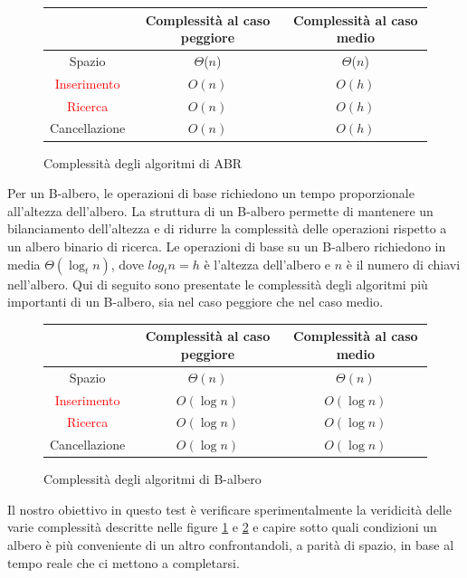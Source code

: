 \begin{figure}[H]
    \centering
    \begin{tabular}{|c|c|c|}
        \hline
         & Complessità al caso peggiore & Complessità al caso medio\\
        \hline
        Spazio & $\Theta$($n$) & $\Theta$($n$)\\
        \hline
        \textcolor{red}{Inserimento} & $O(n)$ & $O(h)$\\
        \hline
        \textcolor{red}{Ricerca} & $O(n)$ & $O(h)$\\
        \hline
        Cancellazione & $O(n)$ & $O(h)$\\
        \hline
    \end{tabular}
    \caption{Complessità degli algoritmi di ABR}
    \label{fig:ComplessitàABR}
\end{figure}

Per un B-albero, le operazioni di base richiedono un tempo proporzionale all'altezza dell'albero. La struttura di un B-albero permette di mantenere un bilanciamento dell'altezza e di ridurre la complessità delle operazioni rispetto a un albero binario di ricerca. Le operazioni di base su un B-albero richiedono in media \(\Theta(\log_t n)\), dove \(log_tn=h\) è l'altezza dell'albero e \(n\) è il numero di chiavi nell'albero. Qui di seguito sono presentate le complessità degli algoritmi più importanti di un B-albero, sia nel caso peggiore che nel caso medio.

\begin{figure}[H]
    \centering
    \begin{tabular}{|c|c|c|}
        \hline
         & Complessità al caso peggiore & Complessità al caso medio\\
        \hline
        Spazio & \(\Theta(n)\) & \(\Theta(n)\)\\
        \hline
        \textcolor{red}{Inserimento} & \(O(\log n)\) & \(O(\log n)\)\\
        \hline
        \textcolor{red}{Ricerca} & \(O(\log n)\) & \(O(\log n)\)\\
        \hline
        Cancellazione & \(O(\log n)\) & \(O(\log n)\)\\
        \hline
    \end{tabular}
    \caption{Complessità degli algoritmi di B-albero}
    \label{fig:ComplessitàBA}
\end{figure}


Il nostro obiettivo in questo test è verificare sperimentalmente la veridicità delle varie complessità descritte nelle figure \ref{fig:ComplessitàABR} e \ref{fig:ComplessitàBA} e capire sotto quali condizioni un albero è più conveniente di un altro confrontandoli, a parità di spazio, in base al tempo reale che ci mettono a completarsi.





